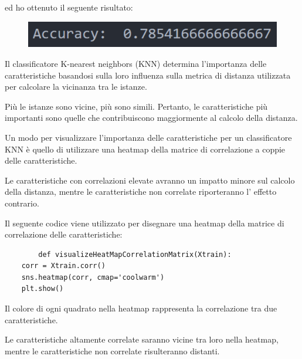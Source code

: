 ed ho ottenuto il seguente risultato:

\begin{figure}
    \begin{center}    
        \includegraphics[width=0.9\linewidth]{images/image38.png}
    \end{center}
\end{figure}

Il classificatore K-nearest neighbors (KNN) determina l'importanza delle caratteristiche basandosi sulla loro influenza sulla metrica di distanza utilizzata per calcolare la vicinanza tra le istanze. 

Più le istanze sono vicine, più sono simili. Pertanto, le caratteristiche più importanti sono quelle che contribuiscono maggiormente al calcolo della distanza.

Un modo per visualizzare l'importanza delle caratteristiche per un classificatore KNN è quello di utilizzare una heatmap della matrice di correlazione a coppie delle caratteristiche. 

Le caratteristiche con correlazioni elevate avranno un impatto minore sul calcolo della distanza, mentre le caratteristiche non correlate riporteranno l' effetto contrario.

Il seguente codice viene utilizzato per disegnare una heatmap della matrice di correlazione delle caratteristiche:
\begin{verbatim}
        def visualizeHeatMapCorrelationMatrix(Xtrain):
    corr = Xtrain.corr()
    sns.heatmap(corr, cmap='coolwarm')
    plt.show()
\end{verbatim}

Il colore di ogni quadrato nella heatmap rappresenta la correlazione tra due caratteristiche. 

Le caratteristiche altamente correlate saranno vicine tra loro nella heatmap, mentre le caratteristiche non correlate risulteranno distanti. 

